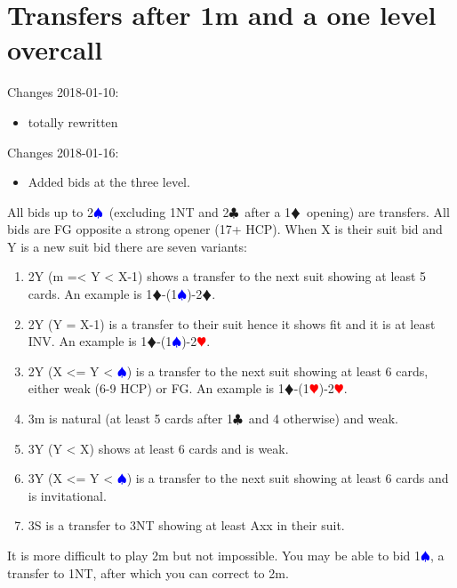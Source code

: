 \documentclass[a4paper]{article}
\newcommand{\BC}{\textcolor{OliveGreen}{$\clubsuit$}}
\newcommand{\BD}{\textcolor{RedOrange}{$\vardiamondsuit$}}
\newcommand{\BH}{\textcolor{Red}{$\varheartsuit${}}}
\newcommand{\BS}{\textcolor{Blue}{$\spadesuit${}}}
\begin{document}
\section{Transfers after 1m and a one level overcall}

Changes 2018-01-10:
\bigbreak
\begin{itemize}
\item totally rewritten

\end{itemize}
\bigbreak
Changes 2018-01-16:
\bigbreak
\begin{itemize}
\item Added bids at the three level.

\end{itemize}
\bigbreak
All bids up to 2\BS\ (excluding 1NT and 2\BC\ after a 1\BD\ opening) are
transfers. All bids are FG opposite a strong opener (17+ HCP).
\bigbreak
When X is their suit bid and Y is a new suit bid there are seven variants:
\bigbreak
\begin{enumerate}
\item 2Y (m =< Y < X-1) shows a transfer to the next suit showing at least 5 cards. An example is 1\BD -(1\BS )-2\BD .

\item 2Y (Y = X-1) is a transfer to their suit hence it shows fit and it is at least INV. An example is 1\BD -(1\BS )-2\BH .

\item 2Y (X <= Y < \BS ) is a transfer to the next suit showing at least 6 cards,
   either weak (6-9 HCP) or FG. An example is 1\BD -(1\BH )-2\BH .

\item 3m is natural (at least 5 cards after 1\BC\ and 4 otherwise) and weak.

\item 3Y (Y < X) shows at least 6 cards and is weak.

\item 3Y (X <= Y < \BS ) is a transfer to the next suit showing at least 6 cards
   and is invitational.

\item 3S is a transfer to 3NT showing at least Axx in their suit.

\end{enumerate}
\bigbreak
It is more difficult to play 2m but not impossible. You may be able to bid
1\BS , a transfer to 1NT, after which you can correct to 2m.
\bigbreak
\
\end{document}
